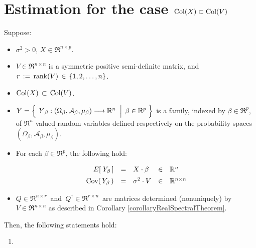 

\section{Estimation for the case $\textnormal{Col}(X) \subset \textnormal{Col}(V)$}
\setcounter{theorem}{0}
\setcounter{equation}{0}

\renewcommand{\theenumi}{\roman{enumi}}
\renewcommand{\labelenumi}{\textnormal{(\theenumi)}$\;\;$}


\begin{theorem}
\mbox{}
\vskip 0.1cm
\noindent
Suppose:
\begin{itemize}
\item
	$\sigma^{2} > 0$,
	$X \in \Re^{n \times p}$.
\item
	$V \in \Re^{n \times n}$ is a symmetric positive semi-definite matrix, and
	\,$r \,:=\, \textnormal{rank}(V) \,\in\, \{1,2,\ldots,n\}$.
\item
	{\color{red}$\textnormal{Col}(X) \,\subset\, \textnormal{Col}(V)$}.
\item
	$Y = \left\{\;
		\left.
		\overset{{\color{white}.}}{Y}_{\beta} : (\Omega_{\beta},\mathcal{A}_{\beta},\mu_{\beta}) \longrightarrow \Re^{n}
		\;\;\right\vert\;
		\beta \in \Re^{p}
		\;\right\}$
	is a family, indexed by $\beta \in \Re^{p}$,
	of $\Re^{n}$-valued random variables defined respectively on the
	probability spaces $(\Omega_{\beta},\mathcal{A}_{\beta},\mu_{\beta})$.
\item
	For each $\beta \in \Re^{p}$, the following hold:
	\begin{equation*}
	\begin{array}{rclcl}
	E\!\left[\;Y_{\beta}\,\right] &  \overset{{\color{white}\vert}}{=} & X \cdot \beta & \in & \Re^{n}
	\\
	\Cov\!\left(\,Y_{\beta}\,\right) & \overset{{\color{white}\vert}}{=} & \sigma^{2} \cdot V & \in & \Re^{n \times n}
	\end{array}
	\end{equation*}
\item
	$Q \in \Re^{n \times r}$\, and \,$Q^{\dagger} \in \Re^{r \times n}$\,
	are matrices determined (nonuniquely) by $V \in \Re^{n \times n}$
	as described in Corollary \ref{corollaryRealSpectralTheorem}.
\end{itemize}
Then, the following statements hold:
\begin{enumerate}
\item

\end{enumerate}
\end{theorem}
